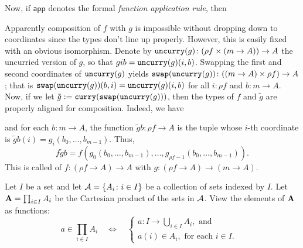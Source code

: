 \documentclass[11pt]{amsart}  %
\begin{document}
Now, if  $\mathsf{app}$ denotes the formal \emph{function application rule}, then
\begin{prooftree}
\end{prooftree}
\begin{prooftree}
\end{prooftree}
Apparently composition of $f$ with $g$ is impossible without dropping down to coordinates
since the types don't line up properly. 
However, this is easily fixed with an obvious isomorphism. 
Denote by $\uncurry{g} \colon (\rho f \times (m \to A)) \to A$
the uncurried version of $g$, so that $gib = \uncurry{g}(i,b)$.
Swapping the first and second coordinates of $\uncurry{g}$ yields
$\swap{\uncurry{g}} \colon ((m\to A) \times \rho f) \to A$; that is  
$\swap{\uncurry{g}}(b,i) = \uncurry{g} (i,b)$ for all $i \colon \rho f$ and $b \colon m \to A$.  
Now, if we let $\tilde{g} := \curry{\swap{\uncurry{g}}}$, then the types of $f$ and $\tilde{g}$ 
are properly aligned for composition.
Indeed, we have
\begin{prooftree}
\end{prooftree}
and for each $b \colon m \to A$, the function $\tilde{g}b \colon \rho f \to A$ is the tuple 
whose $i$-th coordinate is $\tilde{g}b(i) = g_i(b_0, \dots, b_{m-1})$. Thus,
\[
  f\tilde{g} b = f(g_0 (b_0, \dots, b_{m-1}), \dots, g_{\rho f -1}(b_0, \dots, b_{m-1})).
  \]
This is called  of $f : (\rho f \to A) \to A$ with 
$g \colon (\rho f \to A) \to (m \to A)$.
    

Let $I$ be a set and let $\sA = \{A_i \colon i \in I\}$ be
a collection of sets indexed by $I$.
Let $\alg A = \prod_{i\in I} A_i$ be the Cartesian product of 
the sets in $\sA$. 
View the elements of $\alg A$ as functions:
\begin{equation}
  \label{eq:7}
  a \in \prod_{i\in I} A_i \quad \iff
  \quad 
  \begin{cases}
    a\colon I \rightarrow \bigcup_{i\in I} A_i, \text{ and }&\\
    a(i) \in A_i, \text{ for each $i\in I$.} &  
  \end{cases}
\end{equation}
\end{document}
